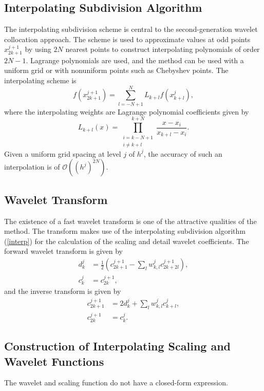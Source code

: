 \documentclass[11pt]{article}
\begin{document}
\subsection{Interpolating Subdivision Algorithm}
The interpolating subdivision scheme is central to the second-generation wavelet collocation approach. The scheme is used to
approximate values at odd points $x_{2k+1}^{j+1}$ by using $2N$ nearest points to construct interpolating polynomials of 
order $2N-1$. Lagrange polynomials are used, and the method can be used with a uniform grid or with 
nonuniform points such as Chebyshev points. The interpolating scheme is 
\begin{equation}
    f(x_{2k+1}^{j+1})=\sum_{l=-N+1}^{N} L_{k+l} f(x_{k+l}^{j}), \label{interp}
\end{equation}
where the interpolating weights are Lagrange polynomial coefficients given by 
\begin{equation}
    L_{k+l}(x)=\prod_{ \substack{ i=k-N+1 \\ i\neq k+l } }^{k+N} \frac{x-x_i}{x_{k+l}-x_i}.
\end{equation}
Given a uniform grid spacing at level $j$ of $h^j$, the accuracy of such an interpolation is of $\mathcal{O}((h^{j})^{2N})$.  

\subsection{Wavelet Transform}
The existence of a fast wavelet transform is one of the attractive qualities of the method. The transform makes use of the 
interpolating subdivision algorithm (\ref{interp}) for the calculation of the scaling and detail wavelet coefficients. The forward wavelet transform is given by
\begin{equation}
	\begin{split}
		d_{k}^{j} &= \frac{1}{2} \left( c_{2k+1}^{j+1}-\sum_{l} w_{k,l}^{j} c_{2k+2l}^{j+1} \right), \\
		c_{k}^{j} &= c_{2k}^{j+1},
	\end{split}
\end{equation}
and the inverse transform is given by 
\begin{equation}
	\begin{split}
		c_{2k+1}^{j+1} &= 2 d_{k}^{j}  + \sum_{l} w_{k,l}^{j} c_{k+l}^{j}, \\
		c_{2k}^{j+1} &= c_{k}^{j}.
	\end{split}
\end{equation}
\subsection{Construction of Interpolating Scaling and Wavelet Functions}
The wavelet and scaling function do not have a closed-form expression.
\end{document}
